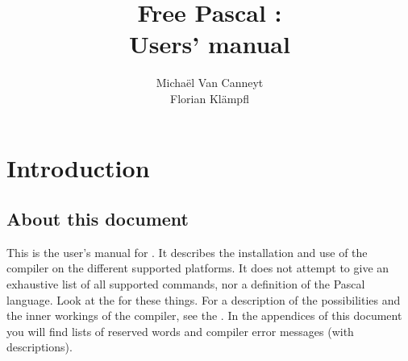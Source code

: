 %
%
%
%
%

\begin{latexonly}
  \ifpdf
  \fi
\end{latexonly}

%
%
\makeindex
%
%

\title{Free Pascal :\\ Users' manual}

\author{Micha\"el Van Canneyt\\Florian Kl\"ampfl}
\maketitle
\tableofcontents

\chapter{Introduction}

\section{About this document}
This is the user's manual for \fpc . It describes the installation and
use of the \fpc compiler on the different supported platforms.
It does not attempt to give an exhaustive list of all supported commands,
nor a definition of the Pascal language. Look at the
 for these things. For a description of the possibilities and the 
inner workings of the compiler, see the
\progref . In the appendices of this document you will find lists of
reserved words and compiler error messages (with descriptions).

